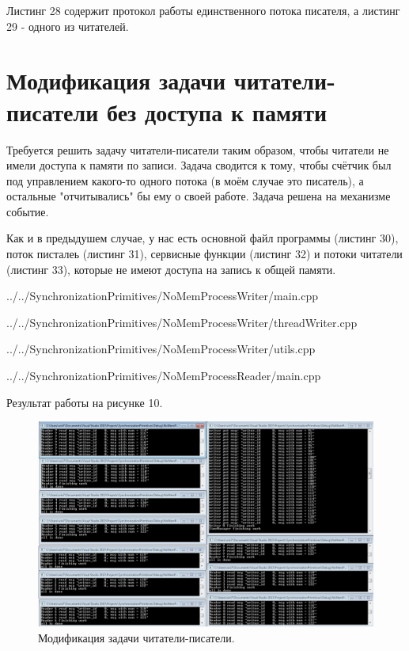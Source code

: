 \documentclass[a4paper, 12pt]{article}		%
\begin{document}
Листинг 28 содержит протокол работы единственного потока писателя, а листинг 29 - одного из читателей.





\newpage
\section{Модификация задачи читатели-писатели без доступа к памяти}

Требуется решить задачу читатели-писатели таким образом, чтобы читатели не имели доступа к памяти по записи. Задача сводится к тому, чтобы счётчик был под управлением какого-то одного потока (в моём случае это писатель), а остальные "отчитывались" бы ему о своей работе. Задача решена на механизме событие.

Как и в предыдушем случае, у нас есть основной файл программы (листинг 30), поток писталеь (листинг 31), сервисные функции (листинг 32) и потоки читатели (листинг 33), которые не имеют доступа на запись к общей памяти.


{../../SynchronizationPrimitives/NoMemProcessWriter/main.cpp}


{../../SynchronizationPrimitives/NoMemProcessWriter/threadWriter.cpp}


{../../SynchronizationPrimitives/NoMemProcessWriter/utils.cpp}
\newpage


{../../SynchronizationPrimitives/NoMemProcessReader/main.cpp}
\newpage

Результат работы на рисунке 10.

\begin{figure}[h!]
\centering
\includegraphics[scale=0.50]{res/008}
\caption{Модификация задачи читатели-писатели.}
\end{figure}
\end{document}
